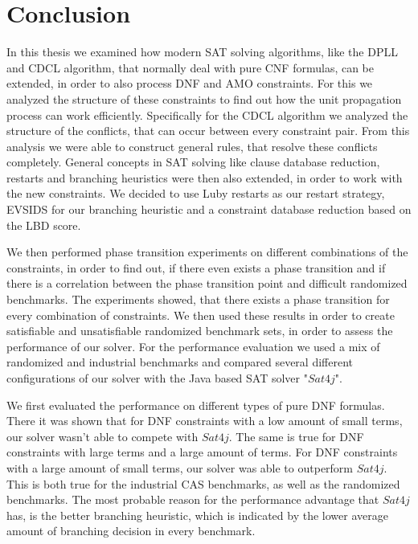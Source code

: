 
\chapter{Conclusion}
\label{ch:Conclusion}

In this thesis we examined how modern SAT solving algorithms, like the DPLL and CDCL algorithm, that normally deal with pure CNF formulas, can be extended, in order to also process DNF and AMO constraints. For this we analyzed the structure of these constraints to find out how the unit propagation process can work efficiently. Specifically for the CDCL algorithm we analyzed the structure of the conflicts, that can occur between every constraint pair. From this analysis we were able to construct general rules, that resolve these conflicts completely. General concepts in SAT solving like clause database reduction, restarts and branching heuristics were then also extended, in order to work with the new constraints. We decided to use Luby restarts as our restart strategy, EVSIDS for our branching heuristic and a constraint database reduction based on the LBD score. 

We then performed phase transition experiments on different combinations of the constraints, in order to find out, if there even exists a phase transition and if there is a correlation between the phase transition point and difficult randomized benchmarks. The experiments showed, that there exists a phase transition for every combination of constraints. We then used these results in order to create satisfiable and unsatisfiable randomized benchmark sets, in order to assess the performance of our solver. For the performance evaluation  we used a mix of randomized and industrial benchmarks and compared several different configurations of our solver with the Java based SAT solver "$Sat4j$".

We first evaluated the performance on different types of pure DNF formulas. There it was shown that for DNF constraints with a low amount of small terms, our solver wasn't able to compete with $Sat4j$. The same is true for DNF constraints with large terms and a large amount of terms. For DNF constraints with a large amount of small terms, our solver was able to outperform $Sat4j$. This is both true for the industrial CAS benchmarks, as well as the randomized benchmarks. The most probable reason for the performance advantage that $Sat4j$ has, is the better branching heuristic, which is indicated by the lower average amount of branching decision in every benchmark.

